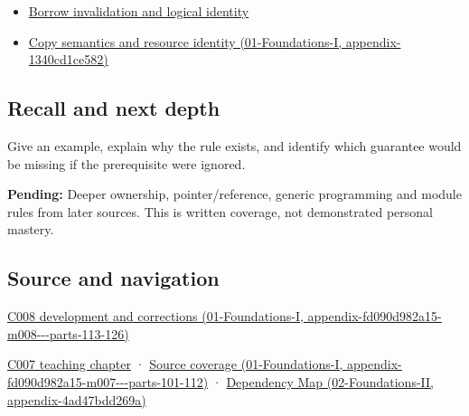 \begin{itemize}
\tightlist
\item
  \hyperref[appendix-f9b8b9188c7f]{Borrow invalidation and logical identity}
\item
  \href{../01-Foundations-I/main.pdf\#nameddest=appendix-1340cd1ce582}{Copy semantics and resource identity (01-Foundations-I, appendix-1340cd1ce582)}
\end{itemize}

\subsection{Recall and next depth}\label{appendix-f1581457d322-recall-and-next-depth}

Give an example, explain why the rule exists, and identify which guarantee would be missing if the prerequisite were ignored.

\textbf{Pending:} Deeper ownership, pointer/reference, generic programming and module rules from later sources. This is written coverage, not demonstrated personal mastery.

\subsection{Source and navigation}\label{appendix-f1581457d322-source-and-navigation}

\href{../01-Foundations-I/main.pdf\#nameddest=appendix-fd090d982a15-m008---parts-113-126}{C008 development and corrections (01-Foundations-I, appendix-fd090d982a15-m008-\/-\/-parts-113-126)}

\hyperref[05-engine-i-ch002-values-occupants-and-addresses-tell-different-stories]{C007 teaching chapter} · \href{../01-Foundations-I/main.pdf\#nameddest=appendix-fd090d982a15-m007---parts-101-112}{Source coverage (01-Foundations-I, appendix-fd090d982a15-m007-\/-\/-parts-101-112)} · \href{../02-Foundations-II/main.pdf\#nameddest=appendix-4ad47bdd269a}{Dependency Map (02-Foundations-II, appendix-4ad47bdd269a)}
